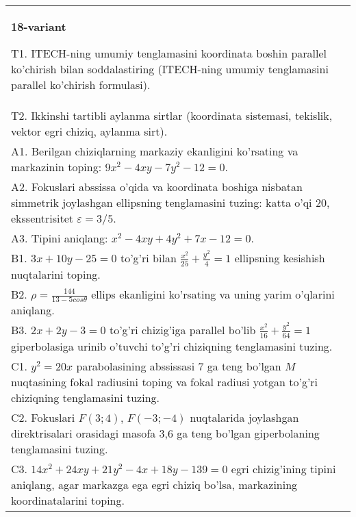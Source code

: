 \documentclass{article}
\begin{document}
\begin{tabular}{m{17cm}}
\textbf{18-variant}
\newline

T1. ITECH-ning umumiy tenglamasini koordinata boshin parallel ko'chirish bilan soddalastiring (ITECH-ning umumiy tenglamasini parallel ko'chirish formulasi).\\

T2. Ikkinshi tartibli aylanma sirtlar (koordinata sistemasi, tekislik, vektor egri chiziq, aylanma sirt).\\

A1. Berilgan chiziqlarning markaziy ekanligini ko'rsating va markazinin toping: $9x^{2}-4xy-7y^{2}-12=0$.\\

A2. Fokuslari abssissa o'qida va koordinata boshiga nisbatan simmetrik joylashgan ellipsning tenglamasini tuzing: katta o'qi $20$, ekssentrisitet $\varepsilon=3/5$.\\

A3. Tipini aniqlang: $x^{2}-4xy+4y^{2}+7x-12=0$.\\

B1. $3x + 10y - 25 = 0$ to'g'ri bilan $\frac{x^{2}}{25} + \frac{y^{2}}{4} = 1$ ellipsning kesishish nuqtalarini toping.  \\

B2. $\rho = \frac{144}{13 - 5cos\theta}$ ellips ekanligini ko'rsating va uning yarim o'qlarini aniqlang.\\

B3. $2x + 2y - 3 = 0$ to'g'ri chizig'iga parallel bo'lib $\frac{x^{2}}{16} + \frac{y^{2}}{64} = 1$ giperbolasiga urinib o'tuvchi to'g'ri chiziqning tenglamasini tuzing.  \\

C1. $y^{2} = 20x$ parabolasining abssissasi 7 ga teng bo'lgan $M$ nuqtasining fokal radiusini toping va fokal radiusi yotgan to'g'ri chiziqning tenglamasini tuzing.  \\

C2. Fokuslari $F(3;4)$, $F(-3;-4)$ nuqtalarida joylashgan direktrisalari orasidagi masofa 3,6 ga teng bo'lgan giperbolaning tenglamasini tuzing.  \\

C3. $14x^{2} + 24xy + 21y^{2} - 4x + 18y - 139 = 0$ egri chizig'ining tipini aniqlang, agar markazga ega egri chiziq bo'lsa, markazining koordinatalarini toping.  \\

\end{tabular}
\vspace{1cm}
\end{document}
